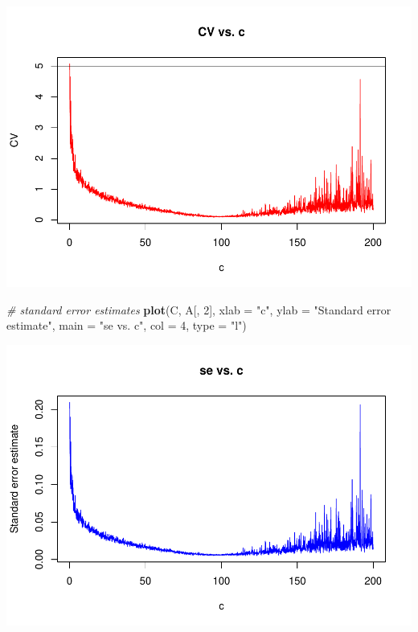 \documentclass[]{article}
\newenvironment{Shaded}{\begin{snugshade}}{\end{snugshade}}
\newcommand{\KeywordTok}[1]{\textcolor[rgb]{0.13,0.29,0.53}{\textbf{{#1}}}}
\newcommand{\DataTypeTok}[1]{\textcolor[rgb]{0.13,0.29,0.53}{{#1}}}
\newcommand{\DecValTok}[1]{\textcolor[rgb]{0.00,0.00,0.81}{{#1}}}
\newcommand{\StringTok}[1]{\textcolor[rgb]{0.31,0.60,0.02}{{#1}}}
\newcommand{\CommentTok}[1]{\textcolor[rgb]{0.56,0.35,0.01}{\textit{{#1}}}}
\newcommand{\NormalTok}[1]{{#1}}
\begin{document}
\includegraphics{Stats406Lab11_files/figure-latex/unnamed-chunk-4-1.pdf}

\begin{Shaded}
\begin{Highlighting}[]
\CommentTok{# standard error estimates}
\KeywordTok{plot}\NormalTok{(C, A[, }\DecValTok{2}\NormalTok{], }\DataTypeTok{xlab =} \StringTok{"c"}\NormalTok{, }\DataTypeTok{ylab =} \StringTok{"Standard error estimate"}\NormalTok{,}
     \DataTypeTok{main =} \StringTok{"se vs. c"}\NormalTok{, }\DataTypeTok{col =} \DecValTok{4}\NormalTok{, }\DataTypeTok{type =} \StringTok{"l"}\NormalTok{)}
\end{Highlighting}
\end{Shaded}

\includegraphics{Stats406Lab11_files/figure-latex/unnamed-chunk-4-2.pdf}
\end{document}

